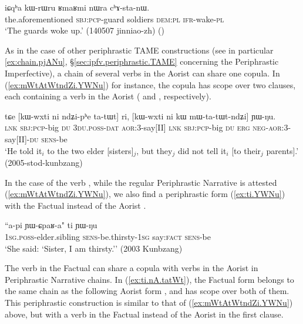 \begin{exe}
\ex \label{ex:chAstanW}
\gll iɕqʰa kɯ-rɯru ʁmaʁmi nɯra cʰɤ-sta-nɯ. \\
the.aforementioned \textsc{sbj}:\textsc{pcp}-guard soldiers \textsc{dem}:\textsc{pl} \textsc{ifr}-wake-\textsc{pl} \\
\glt `The guards woke up.' (140507 jinniao-zh)
()
\end{exe}

As in the case of other periphrastic TAME constructions (see in particular \ref{ex:chain.pjANu}, §\ref{sec:ipfv.periphrastic.TAME} concerning the Periphrastic Imperfective), a chain of several verbs in the Aorist can share one copula. In (\ref{ex:mWtAtWtndZi.YWNu}) for instance, the copula  has scope over two clauses, each containing a verb in the Aorist ( and , respectively).

\begin{exe}
\ex \label{ex:mWtAtWtndZi.YWNu}
\gll tɕe [kɯ-wxti ni ndʑi-pʰe ta-tɯt] ri, [kɯ-wxti ni kɯ mɯ-ta-tɯt-ndʑi] ɲɯ-ŋu. \\
\textsc{lnk} \textsc{sbj}:\textsc{pcp}-big \textsc{du} \textsc{3du}.\textsc{poss}-\textsc{dat} \textsc{aor}:3\flobv{}-say[II] \textsc{lnk} \textsc{sbj}:\textsc{pcp}-big \textsc{du} \textsc{erg} \textsc{neg}-\textsc{aor}:3\flobv{}-say[II]-\textsc{du} \textsc{sens}-be \\
\glt `He told it$_i$ to the two elder [sisters]$_j$, but they$_j$ did not tell it$_i$ [to their$_j$ parents].' (2005-stod-kunbzang)
\end{exe}

In the case of the verb , while the regular Periphrastic Narrative is attested (\ref{ex:mWtAtWtndZi.YWNu}), we also find a periphrastic form  (\ref{ex:ti.YWNu}) with the Factual  instead of the Aorist .

\begin{exe}
\ex \label{ex:ti.YWNu}
\gll ``a-pi ɲɯ-ɕpaʁ-a" ti ɲɯ-ŋu \\
\textsc{1sg}.\textsc{poss}-elder.sibling \textsc{sens}-be.thirsty-\textsc{1sg} say:\textsc{fact} \textsc{sens}-be \\
\glt `She said: `Sister, I am thirsty.'' (2003 Kunbzang)
\end{exe}

The verb  in the Factual can share a copula with verbs in the Aorist in Periphrastic Narrative chains. In (\ref{ex:ti.nA.tatWt}), the Factual form  belongs to the same chain as the following Aorist form , and  has scope over both of them. This periphrastic construction is similar to that of (\ref{ex:mWtAtWtndZi.YWNu}) above, but with a verb in the Factual instead of the Aorist in the first clause.

